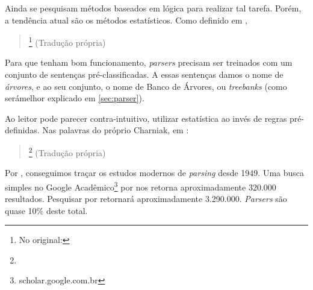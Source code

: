 Ainda se pesquisam métodos baseados em lógica para realizar tal tarefa. Porém, 
a tendência atual são os métodos estatísticos. Como definido em ,
\begin{quote}
    \footnote{No original: }
    (Tradução própria)
\end{quote}
Para que tenham bom funcionamento, \textit{parsers} precisam ser treinados com um conjunto de sentenças pré-classificadas. A essas sentenças damos o nome de \textit{árvores}, e ao seu conjunto, o nome de Banco de Árvores, ou \textit{treebanks} (como serámelhor explicado em \ref{sec:parser}).

Ao leitor pode parecer contra-intuitivo, utilizar estatística ao invés de regras pré-definidas. Nas palavras do próprio Charniak, em \cite[p~89]{Moor2006DartmouthIA}:
\begin{quote}
    \footnote{}
    (Tradução própria)
\end{quote}
Por \cite{kegler2019parsing}, conseguimos traçar os estudos modernos de \textit{parsing} desde 1949. 
Uma busca simples no Google Acadêmico\footnote{scholar.google.com.br} por  nos retorna aproximadamente 320.000 resultados. Pesquisar por  retornará aproximadamente 3.290.000. \textit{Parsers} são quase 10\%
deste total.

